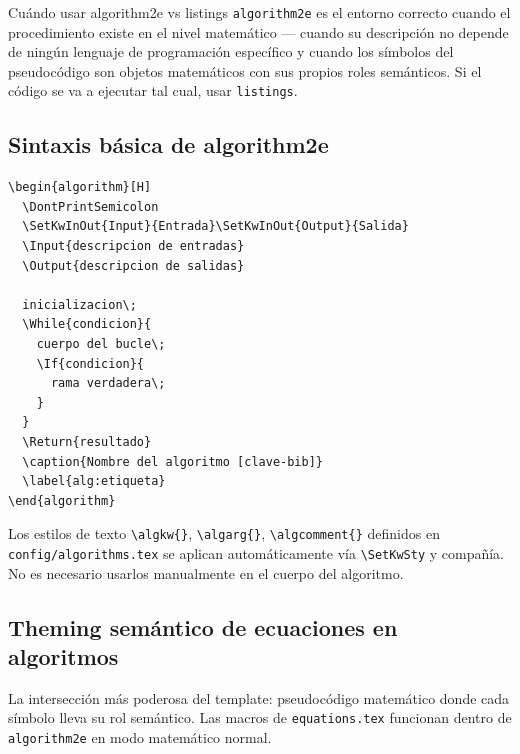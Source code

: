 \begin{definicion}{Cuándo usar algorithm2e vs listings}
\label{def:algo-vs-listings}
\texttt{algorithm2e} es el entorno correcto cuando el procedimiento existe
en el nivel matemático — cuando su descripción no depende de ningún lenguaje
de programación específico y cuando los símbolos del pseudocódigo son objetos
matemáticos con sus propios roles semánticos. Si el código se va a ejecutar
tal cual, usar \texttt{listings}.
\end{definicion}

\subsection{Sintaxis básica de algorithm2e}
\label{subsec:algo-sintaxis}

\begin{lstlisting}[style=latex, frame=none, numbers=none]
\begin{algorithm}[H]
  \DontPrintSemicolon
  \SetKwInOut{Input}{Entrada}\SetKwInOut{Output}{Salida}
  \Input{descripcion de entradas}
  \Output{descripcion de salidas}

  inicializacion\;
  \While{condicion}{
    cuerpo del bucle\;
    \If{condicion}{
      rama verdadera\;
    }
  }
  \Return{resultado}
  \caption{Nombre del algoritmo [clave-bib]}
  \label{alg:etiqueta}
\end{algorithm}
\end{lstlisting}

Los estilos de texto \texttt{\textbackslash algkw\{\}}, \texttt{\textbackslash algarg\{\}},
\texttt{\textbackslash algcomment\{\}} definidos en \texttt{config/algorithms.tex}
se aplican automáticamente vía \texttt{\textbackslash SetKwSty} y compañía.
No es necesario usarlos manualmente en el cuerpo del algoritmo.

\subsection{Theming semántico de ecuaciones en algoritmos}
\label{subsec:algo-ecuaciones}

La intersección más poderosa del template: pseudocódigo matemático donde
cada símbolo lleva su rol semántico. Las macros de \texttt{equations.tex}
funcionan dentro de \texttt{algorithm2e} en modo matemático normal.


